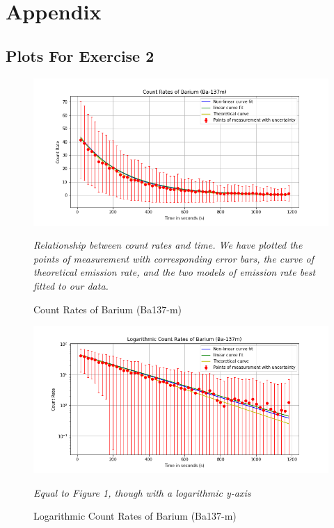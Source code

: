 \documentclass[letterpaper,12pt]{article}
\begin{document}
\pagebreak

\appendix

\section{Appendix}

\subsection{Plots For Exercise 2}
\begin{figure}[H]
  \centering
  \includegraphics[width=0.95\linewidth]{../Exercise2/Fredrik/Count Rates of Barium (Ba-137m).png}    
  \begin{center}
    \emph{
      Relationship between count rates and time. We have plotted the points of measurement 
      with corresponding error bars, the curve of theoretical emission rate, and the two models 
      of emission rate best fitted to our data.}
  \end{center}
  \caption{Count Rates of Barium (Ba137-m)}
  \label{ba-count-rates}
\end{figure}

\begin{figure}[H]
  \centering
  \includegraphics[width=0.95\linewidth]{../Exercise2/Fredrik/Logarithmic Count Rates of Barium (Ba-137m).png}   
  \begin{center}
    \emph{
      Equal to Figure 1, though with a logarithmic y-axis}
  \end{center}
  \caption{Logarithmic Count Rates of Barium (Ba137-m)}
  \label{ba-count-rates-log}
\end{figure}
\end{document}
